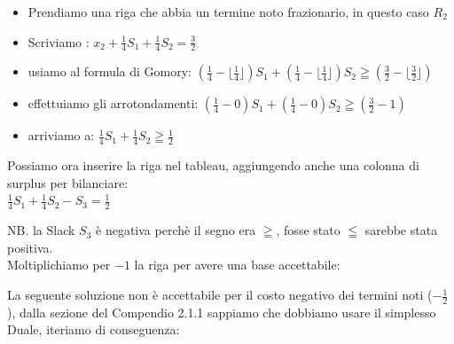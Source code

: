\documentclass{article}
\begin{document}
\begin{itemize}
\item Prendiamo una riga che abbia un termine noto frazionario, in questo caso $R_2$
\item Scriviamo : $x_2 + \frac{1}{4} S_1 + \frac{1}{4} S_2 = \frac{3}{2}$
\item usiamo al formula di Gomory: $  ( \frac{1}{4} - \lfloor \frac{1}{4} \rfloor )S_1 +  ( \frac{1}{4} - \lfloor \frac{1}{4} \rfloor )S_2 \geqq ( \frac{3}{2} - \lfloor \frac{3}{2} \rfloor )$
\item effettuiamo gli arrotondamenti: $  ( \frac{1}{4} - 0 )S_1 +  ( \frac{1}{4} - 0 )S_2 \geqq ( \frac{3}{2} - 1 )$
\item arriviamo a: $\frac{1}{4}S_1 + \frac{1}{4}S_2 \geqq \frac{1}{2}$
\end{itemize}

Possiamo ora inserire la riga nel tableau, aggiungendo anche una colonna di surplus per bilanciare:\\

$\frac{1}{4}S_1 + \frac{1}{4}S_2 -S_3 = \frac{1}{2}$

NB. la Slack $S_3$ è negativa perchè il segno era $\geqq$, fosse stato $\leqq$ sarebbe stata positiva.\\
Moltiplichiamo per $-1$ la riga per avere una base accettabile:\\
\begin{center}
\end{center}

La seguente soluzione non è accettabile per il costo negativo dei termini noti ($-\frac{1}{2}$), dalla sezione del Compendio 2.1.1 sappiamo che dobbiamo usare il simplesso Duale, iteriamo di conseguenza:\\

\begin{center}
\end{center}
\end{document}
